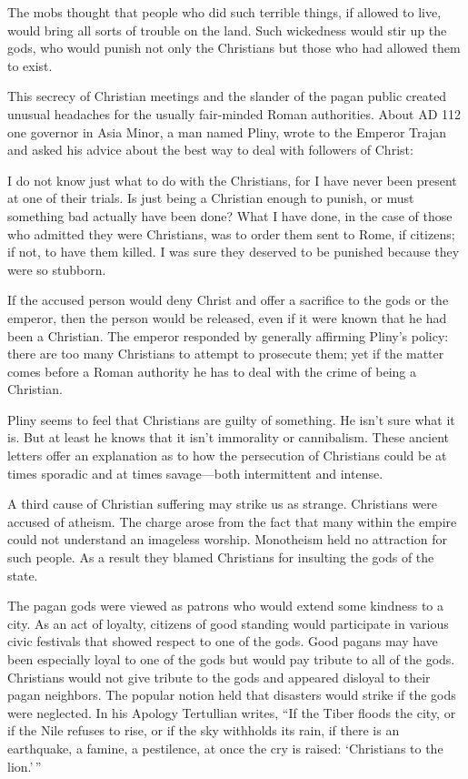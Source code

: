 The mobs thought that people who did such terrible things, if allowed to live, would bring all sorts
of trouble on the land. Such wickedness would stir up the gods, who would punish not only the
Christians but those who had allowed them to exist.

This secrecy of Christian meetings and the slander of the pagan public created unusual headaches for
the usually fair-minded Roman authorities. About AD 112 one governor in Asia Minor, a man named
Pliny, wrote to the Emperor Trajan and asked his advice about the best way to deal with followers of
Christ:

\begin{blockquote}
I do not know just what to do with the Christians, for I have never been present at one of their
trials. Is just being a Christian enough to punish, or must something bad actually have been done?
What I have done, in the case of those who admitted they were Christians, was to order them sent to
Rome, if citizens; if not, to have them killed. I was sure they deserved to be punished because they
were so stubborn.
\end{blockquote}

If the accused person would deny Christ and offer a sacrifice to the gods or the emperor, then the
person would be released, even if it were known that he had been a Christian. The emperor responded
by generally affirming Pliny’s policy: there are too many Christians to attempt to prosecute them;
yet if the matter comes before a Roman authority he has to deal with the crime of being a Christian.

Pliny seems to feel that Christians are guilty of something. He isn’t sure what it is. But at least
he knows that it isn’t immorality or cannibalism. These ancient letters offer an explanation as to
how the persecution of Christians could be at times sporadic and at times savage—both intermittent
and intense.

A third cause of Christian suffering may strike us as strange. Christians were accused of atheism.
The charge arose from the fact that many within the empire could not understand an imageless
worship. Monotheism held no attraction for such people. As a result they blamed Christians for
insulting the gods of the state.

The pagan gods were viewed as patrons who would extend some kindness to a city. As an act of
loyalty, citizens of good standing would participate in various civic festivals that showed respect
to one of the gods. Good pagans may have been especially loyal to one of the gods but would pay
tribute to all of the gods. Christians would not give tribute to the gods and appeared disloyal to
their pagan neighbors. The popular notion held that disasters would strike if the gods were
neglected. In his Apology Tertullian writes, “If the Tiber floods the city, or if the Nile refuses
to rise, or if the sky withholds its rain, if there is an earthquake, a famine, a pestilence, at
once the cry is raised: ‘Christians to the lion.’\,”

